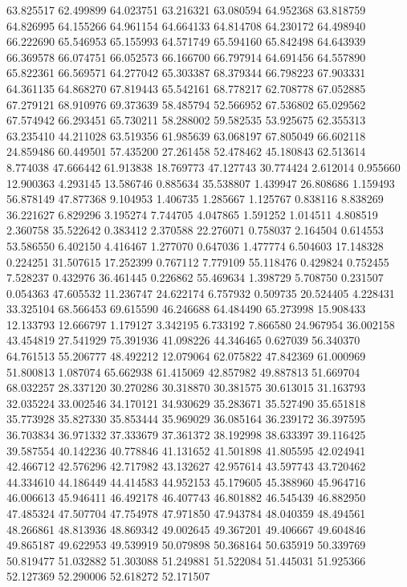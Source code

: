 63.825517
62.499899
64.023751
63.216321
63.080594
64.952368
63.818759
64.826995
64.155266
64.961154
64.664133
64.814708
64.230172
64.498940
66.222690
65.546953
65.155993
64.571749
65.594160
65.842498
64.643939
66.369578
66.074751
66.052573
66.166700
66.797914
64.691456
64.557890
65.822361
66.569571
64.277042
65.303387
68.379344
66.798223
67.903331
64.361135
64.868270
67.819443
65.542161
68.778217
62.708778
67.052885
67.279121
68.910976
69.373639
58.485794
52.566952
67.536802
65.029562
67.574942
66.293451
65.730211
58.288002
59.582535
53.925675
62.355313
63.235410
44.211028
63.519356
61.985639
63.068197
67.805049
66.602118
24.859486
60.449501
57.435200
27.261458
52.478462
45.180843
62.513614
8.774038
47.666442
61.913838
18.769773
47.127743
30.774424
2.612014
0.955660
12.900363
4.293145
13.586746
0.885634
35.538807
1.439947
26.808686
1.159493
56.878149
47.877368
9.104953
1.406735
1.285667
1.125767
0.838116
8.838269
36.221627
6.829296
3.195274
7.744705
4.047865
1.591252
1.014511
4.808519
2.360758
35.522642
0.383412
2.370588
22.276071
0.758037
2.164504
0.614553
53.586550
6.402150
4.416467
1.277070
0.647036
1.477774
6.504603
17.148328
0.224251
31.507615
17.252399
0.767112
7.779109
55.118476
0.429824
0.752455
7.528237
0.432976
36.461445
0.226862
55.469634
1.398729
5.708750
0.231507
0.054363
47.605532
11.236747
24.622174
6.757932
0.509735
20.524405
4.228431
33.325104
68.566453
69.615590
46.246688
64.484490
65.273998
15.908433
12.133793
12.666797
1.179127
3.342195
6.733192
7.866580
24.967954
36.002158
43.454819
27.541929
75.391936
41.098226
44.346465
0.627039
56.340370
64.761513
55.206777
48.492212
12.079064
62.075822
47.842369
61.000969
51.800813
1.087074
65.662938
61.415069
42.857982
49.887813
51.669704
68.032257
28.337120
30.270286
30.318870
30.381575
30.613015
31.163793
32.035224
33.002546
34.170121
34.930629
35.283671
35.527490
35.651818
35.773928
35.827330
35.853444
35.969029
36.085164
36.239172
36.397595
36.703834
36.971332
37.333679
37.361372
38.192998
38.633397
39.116425
39.587554
40.142236
40.778846
41.131652
41.501898
41.805595
42.024941
42.466712
42.576296
42.717982
43.132627
42.957614
43.597743
43.720462
44.334610
44.186449
44.414583
44.952153
45.179605
45.388960
45.964716
46.006613
45.946411
46.492178
46.407743
46.801882
46.545439
46.882950
47.485324
47.507704
47.754978
47.971850
47.943784
48.040359
48.494561
48.266861
48.813936
48.869342
49.002645
49.367201
49.406667
49.604846
49.865187
49.622953
49.539919
50.079898
50.368164
50.635919
50.339769
50.819477
51.032882
51.303088
51.249881
51.522084
51.445031
51.925366
52.127369
52.290006
52.618272
52.171507
